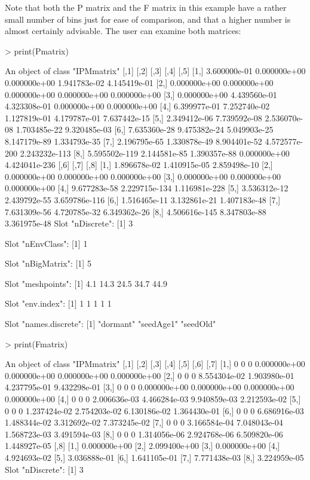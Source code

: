 \documentclass{article}
\begin{document}
Note that both the P matrix and the F matrix in this example have a rather small number of bins just for ease of comparison, and that a higher number is almost certainly advisable. The user can examine both matrices: 
\begin{Schunk}
\begin{Sinput}
> print(Pmatrix)
\end{Sinput}
\begin{Soutput}
An object of class "IPMmatrix"
              [,1]         [,2]         [,3]          [,4]          [,5]
[1,]  3.600000e-01 0.000000e+00 0.000000e+00  1.941783e-02  4.145419e-01
[2,]  0.000000e+00 0.000000e+00 0.000000e+00  0.000000e+00  0.000000e+00
[3,]  0.000000e+00 4.439560e-01 4.323308e-01  0.000000e+00  0.000000e+00
[4,]  6.399977e-01 7.252740e-02 1.127819e-01  4.179787e-01  7.637442e-15
[5,]  2.349412e-06 7.739592e-08 2.536070e-08  1.703485e-22  9.320485e-03
[6,]  7.635360e-28 9.475382e-24 5.049903e-25  8.147179e-89  1.334793e-35
[7,]  2.196795e-65 1.330878e-49 8.904401e-52 4.572577e-200 2.243232e-113
[8,] 5.595502e-119 2.144581e-85 1.390357e-88  0.000000e+00 4.424041e-236
              [,6]          [,7]          [,8]
[1,]  1.896678e-02  1.410915e-05  2.859498e-10
[2,]  0.000000e+00  0.000000e+00  0.000000e+00
[3,]  0.000000e+00  0.000000e+00  0.000000e+00
[4,]  9.677283e-58 2.229715e-134 1.116981e-228
[5,]  3.536312e-12  2.439792e-55 3.659786e-116
[6,]  1.516465e-11  3.132861e-21  1.407183e-48
[7,]  7.631309e-56  4.720785e-32  6.349362e-26
[8,] 4.506616e-145  8.347803e-88  3.361975e-48
Slot "nDiscrete":
[1] 3

Slot "nEnvClass":
[1] 1

Slot "nBigMatrix":
[1] 5

Slot "meshpoints":
[1]  4.1 14.3 24.5 34.7 44.9

Slot "env.index":
[1] 1 1 1 1 1

Slot "names.discrete":
[1] "dormant"  "seedAge1" "seedOld" 
\end{Soutput}
\begin{Sinput}
> print(Fmatrix)
\end{Sinput}
\begin{Soutput}
An object of class "IPMmatrix"
     [,1] [,2] [,3]         [,4]         [,5]         [,6]         [,7]
[1,]    0    0    0 0.000000e+00 0.000000e+00 0.000000e+00 0.000000e+00
[2,]    0    0    0 8.554304e-02 1.903980e-01 4.237795e-01 9.432298e-01
[3,]    0    0    0 0.000000e+00 0.000000e+00 0.000000e+00 0.000000e+00
[4,]    0    0    0 2.006636e-03 4.466284e-03 9.940859e-03 2.212593e-02
[5,]    0    0    0 1.237424e-02 2.754203e-02 6.130186e-02 1.364430e-01
[6,]    0    0    0 6.686916e-03 1.488344e-02 3.312692e-02 7.373245e-02
[7,]    0    0    0 3.166584e-04 7.048043e-04 1.568723e-03 3.491594e-03
[8,]    0    0    0 1.314056e-06 2.924768e-06 6.509820e-06 1.448927e-05
             [,8]
[1,] 0.000000e+00
[2,] 2.099400e+00
[3,] 0.000000e+00
[4,] 4.924693e-02
[5,] 3.036888e-01
[6,] 1.641105e-01
[7,] 7.771438e-03
[8,] 3.224959e-05
Slot "nDiscrete":
[1] 3


\end{Soutput}
\end{Schunk}
\end{document}

